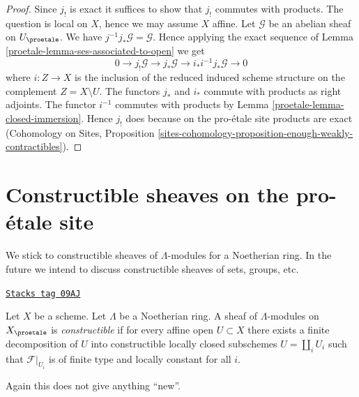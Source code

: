 \begin{proof}

Since $j_!$ is exact it suffices to show that $j_!$ commutes with products.
The question is local on $X$, hence we may assume $X$ affine.
Let $\mathcal{G}$ be an abelian sheaf on $U_\proetale$.
We have $j^{-1}j_*\mathcal{G} = \mathcal{G}$. Hence applying
the exact sequence of Lemma \ref{proetale-lemma-ses-associated-to-open}
we get
$$
0 \to j_!\mathcal{G} \to j_*\mathcal{G} \to i_*i^{-1}j_*\mathcal{G} \to 0
$$
where $i : Z \to X$ is the inclusion of the reduced induced scheme
structure on the complement $Z = X \setminus U$.
The functors $j_*$ and $i_*$ commute with products as right adjoints.
The functor $i^{-1}$ commutes with products by
Lemma \ref{proetale-lemma-closed-immersion}.
Hence $j_!$ does because on the pro-\'etale site products
are exact
(Cohomology on Sites, Proposition
\ref{sites-cohomology-proposition-enough-weakly-contractibles}).
\end{proof}

\section{Constructible sheaves on the pro-\'etale site}
\label{proetale-section-constructible}
We stick to constructible sheaves of $\Lambda$-modules for a
Noetherian ring. In the future we intend to discuss constructible
sheaves of sets, groups, etc.

\begin{definition}[Constructible]
\label{proetale-definition-constructible}
\href{https://stacks.math.columbia.edu/tag/09AJ}{\texttt{Stacks tag 09AJ}}

Let $X$ be a scheme.
Let $\Lambda$ be a Noetherian ring. A sheaf of $\Lambda$-modules
on $X_\proetale$ is {\it constructible} if for every affine open
$U \subset X$ there exists a finite decomposition
of $U$ into constructible locally closed subschemes
$U = \coprod_i U_i$ such that
$\mathcal{F}|_{U_i}$ is of finite type and locally constant for all $i$.
\end{definition}

Again this does not give anything ``new''.

